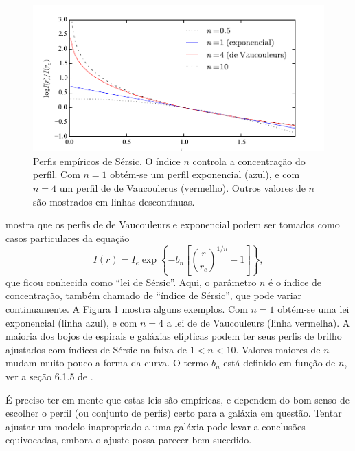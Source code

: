 
\begin{figure}
	\includegraphics{figuras/morphModels}
	\caption[Perfis empíricos de Sérsic]
	{Perfis empíricos de Sérsic. O índice $n$ controla a concentração do perfil.
	Com $n\!=\!1$ obtém-se um perfil exponencial (azul), e com $n\!=\!4$ um perfil
	de de Vaucoulerus (vermelho). Outros valores de $n$ são mostrados em
	linhas descontínuas.}
	\label{fig:MorphLaws}
\end{figure}

\citet{Sersic1963} mostra que os perfis de de Vaucouleurs e exponencial podem
ser tomados como casos particulares da equação
\begin{equation*}
I(r) = I_e \exp \left\{- b_n \left[ \left( \frac{r}{r_e} \right)^{1/n}
- 1 \right] \right\},
\end{equation*}
que ficou conhecida como ``lei de Sérsic''. Aqui, o parâmetro $n$ é o índice de
concentração, também chamado de ``índice de Sérsic'', que pode variar
continuamente. A Figura \ref{fig:MorphLaws} mostra alguns exemplos. Com
$n\!=\!1$ obtém-se uma lei exponencial (linha azul), e com $n\!=\!4$ a lei de de
Vaucouleurs (linha vermelha). A maioria dos bojos de espirais e galáxias
elípticas podem ter seus perfis de brilho ajustados com índices de Sérsic na
faixa de $1 < n < 10$. Valores maiores de $n$ mudam muito pouco a forma da
curva. O termo $b_n$ está definido em função de $n$, ver a seção 6.1.5 de
\citet{Erwin2015}.

É preciso ter em mente que estas leis são empíricas, e dependem do bom senso de
escolher o perfil (ou conjunto de perfis) certo para a galáxia em questão.
Tentar ajustar um modelo inapropriado a uma galáxia pode levar a conclusões
equivocadas, embora o ajuste possa parecer bem sucedido.



